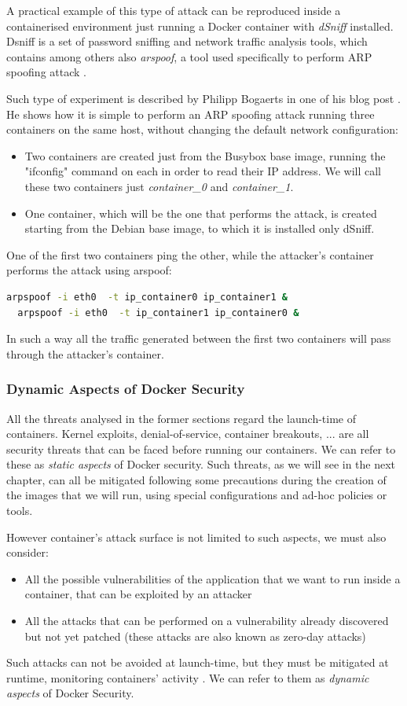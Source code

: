\documentclass[a4paper,12pt]{article}
\begin{document}
A practical example of this type of attack can be reproduced inside a
containerised environment just running a Docker container with \textit{dSniff}
installed. Dsniff is a set of password sniffing and network traffic analysis
tools, which contains among others also \textit{arspoof}, a tool used
specifically to perform ARP spoofing attack \cite{wiki_dsniff}. \par Such type of
experiment is described by Philipp Bogaerts in one of his blog post
 \cite{bogaerts_arpspoof}. He shows how it is simple to perform an ARP spoofing
attack running three containers on the same host, without changing the default
network configuration:
\begin{itemize}
  \item Two containers are created just from the Busybox base image, running the
  "ifconfig" command on each in order to read their IP address. We will call
  these two containers just \textit{container\_0} and \textit{container\_1}.
  \item One container, which will be the one that performs the attack, is created
  starting from the Debian base image, to which it is installed only dSniff. 
\end{itemize}
One of the first two containers ping the other, while the attacker's container
performs the attack using arspoof:
\begin{lstlisting}[language=bash,breaklines]
  arpspoof -i eth0  -t ip_container0 ip_container1 &
  arpspoof -i eth0  -t ip_container1 ip_container0 &
\end{lstlisting}
In such a way all the traffic generated between the first two containers will
pass through the attacker's container.

\subsubsection{Dynamic Aspects of Docker Security}

All the threats analysed in the former sections regard the launch-time of
containers. Kernel exploits, denial-of-service, container breakouts, ... are
all security threats that can be faced before running our containers. We can
refer to these as \textit{static aspects} of Docker security. Such threats, as
we will see in the next chapter, can all be mitigated following some precautions
during the creation of the images that we will run, using special configurations
and ad-hoc policies or tools.\par However container's attack surface is not
limited to such aspects, we must also consider:
\begin{itemize}
  \item All the possible vulnerabilities of the application that we want to run
  inside a container, that can be exploited by an attacker
  \item All the attacks that can be performed on a vulnerability already
  discovered but not yet patched (these attacks are also known as zero-day
  attacks)
\end{itemize}
Such attacks can not be avoided at launch-time, but they must be mitigated at
runtime, monitoring containers' activity . We can refer to them as
\textit{dynamic aspects} of Docker Security. 
\end{document}
